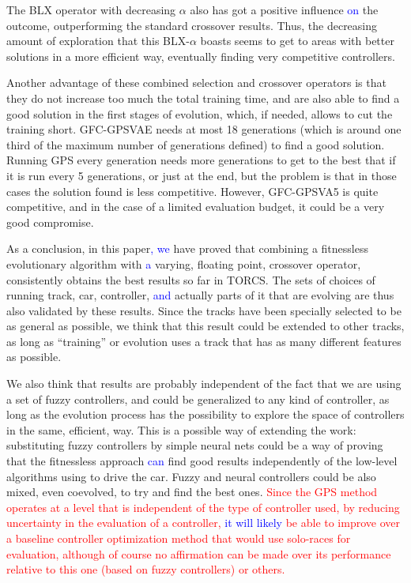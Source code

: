 \documentclass[10pt,journal,compsoc]{IEEEtran}
\begin{document}
The  BLX operator with decreasing $\alpha$ also has got a positive
influence \textcolor{blue}{on} the outcome, outperforming the standard crossover
results. Thus, the decreasing amount of exploration that this BLX-$\alpha$ boasts seems to get to areas with better solutions in a
more efficient way, eventually finding very competitive controllers.

Another advantage of these combined selection and crossover operators is that they do not
increase too much the total training time, and are also able to find a
good solution in the first stages of evolution, which, if needed,
allows to cut the training short. {\sf GFC-GPSVAE} needs at most 18
generations (which is around one third of the maximum number of
generations defined) to find a good solution. Running GPS every
generation needs more generations to get to the best that if it is run
every 5 generations, or just at the end, but the problem is that in
those cases the solution found is less competitive. However, {\sf
  GFC-GPSVA5} is quite competitive, and in the case of a limited
evaluation budget, it could be a very good compromise.

As a conclusion, in this paper\textcolor{blue}{, we} have proved that combining a fitnessless evolutionary algorithm with \textcolor{blue}{a} varying, floating point,
crossover operator, consistently obtains the best results so far in
TORCS. The sets of choices of running track, car, controller, \textcolor{blue}{and} actually parts of it that are evolving are thus also validated by
these results. Since the tracks have been specially selected to be as
general as possible, we think that this result could be extended to
other tracks, as long as ``training'' or evolution uses a track that
has as many different features as possible.

We also think that results are probably independent of the fact that
we are using a set of fuzzy controllers, and could be
generalized to any kind of controller, as long as the evolution
process has the possibility to explore the space of controllers in the
same, efficient, way. This is a possible way of extending the work:
substituting fuzzy controllers by simple neural nets could be a way of
proving that the fitnessless approach \textcolor{blue}{can} find good results
independently of the low-level algorithms using to drive the
car. Fuzzy and neural controllers could be also mixed, even coevolved,
to try and find the best ones. \textcolor{red}{Since the GPS method
  operates at a level that is independent of the type of controller used, by
  reducing uncertainty in the evaluation of a controller, \textcolor{blue}{it will likely} be able to improve over a baseline controller
  optimization method that would use solo-races for evaluation, although of course no affirmation
  can be made over its performance relative to this one (based on
  fuzzy controllers) or others.}
\end{document}
